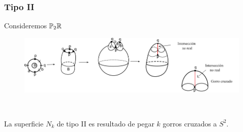 \documentclass[GTS.tex]{subfiles}
\begin{document}
\subsubsection{Tipo II}

\begin{flushleft}
Consideremos $\mathbb{P}_2\mathbb{R}$
\begin{figure}[h!]
	\includegraphics[scale=0.7]{gorroink}
\end{figure}
\end{flushleft}\

\begin{teorema} La superficie $N_k$ de tipo II es resultado de pegar $k$ gorros cruzados a $S^2$.
\end{teorema}
\end{document}
